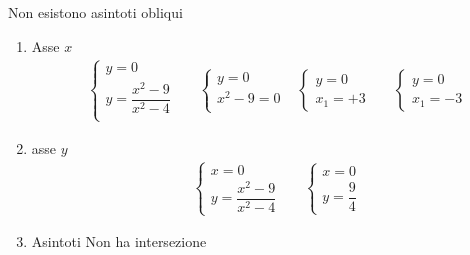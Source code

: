 \begin{exercise}
\begin{itemize}
\begin{enumerate}
		Non esistono asintoti obliqui
	\end{enumerate}
	\begin{enumerate}
		\item Asse $x$
			\begin{align*}
		&\begin{cases}
		y=0\\
		y=\dfrac{x^2-9}{x^2-4}\\
		\end{cases}
		&&\begin{cases}
		y=0\\
		x^2-9=0\\
		\end{cases}
		&\begin{cases}
		y=0\\
		x_1=+3
		\end{cases}&
		&\begin{cases}
		y=0\\
		x_1=-3
		\end{cases}
		\end{align*}
		\item asse $y$
		\begin{align*}
		&\begin{cases}
		x=0\\
		y=\dfrac{x^2-9}{x^2-4}
		\end{cases}&&\begin{cases}
		x=0\\
		y=\dfrac{9}{4}
		\end{cases}
		\end{align*}
		\item Asintoti
		Non ha intersezione
	\end{enumerate}
\end{itemize}
\begin{center}
	
\end{center}
\end{exercise}




